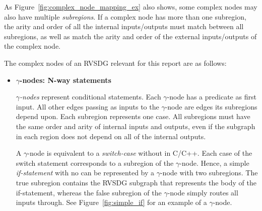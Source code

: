 As Figure~\ref{fig:complex_node_mapping_ex} also shows, some complex nodes may
also have multiple \textit{subregions}. If a complex node has more than one
subregion, the arity and order of all the internal inputs/outputs must match
between all subregions, as well as match the arity and order of the external
inputs/outputs of the complex node.

The complex nodes of an RVSDG relevant for this report are as follows:

\begin{itemize}

\item \textbf{$\gamma$-nodes: N-way statements}

\textit{$\gamma$-nodes} represent conditional statements. Each $\gamma$-node has
a predicate as first input. All other edges passing as inputs to the
$\gamma$-node are edges its subregions depend upon. Each subregion represents
one case. All subregions must have the same order and arity of internal inputs
and outputs, even if the subgraph in each region does not depend on all of the
internal outputs.

A $\gamma$-node is equivalent to a \textit{switch-case} without  in
C/C++. Each case of the switch statement corresponds to a subregion of the
$\gamma$-node. Hence, a simple \textit{if-statement} with no  can be
represented by a $\gamma$-node with two subregions. The true subregion contains
the RVSDG subgraph that represents the body of the if-statement, whereas the
false subregion of the $\gamma$-node simply routes all inputs through. See
Figure~\ref{fig:simple_if} for an example of a $\gamma$-node.


\end{itemize}
